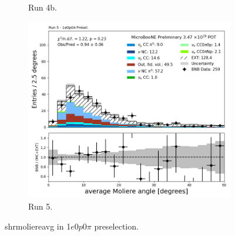 \begin{figure}[H]
\begin{subfigure}[t]{0.32\linewidth}
        \caption{Run 4b.}
    \end{subfigure}%
    \hspace{0.2cm}%
    \begin{subfigure}[t]{0.32\linewidth}
        \includegraphics[width=\linewidth]{technote/Appendix_Preselection/Figures/1e0p0pi/Run5/shrmoliereavg_Run5_1e0p0pi_Presel.png}
        \caption{Run 5.}
    \end{subfigure}
    \caption{shrmoliereavg in 1$e$0$p$0$\pi$ preselection.}
\end{figure}

